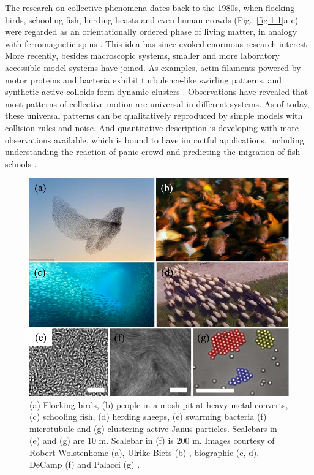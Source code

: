 The research on collective phenomena dates back to the 1980s, when flocking birds, schooling fish, herding beasts and even human crowds (Fig.~\ref{fig:1-1}a-c) were regarded as an orientationally ordered phase of living matter, in analogy with ferromagnetic spins
\cite{Reynolds1987, Vicsek1995, Narayan2007, Ward2008, Ballerini2008, Silverberg2013}. This idea has since evoked enormous research interest. More recently, besides macroscopic systems, smaller and more laboratory accessible model systems have joined. As examples, actin filaments powered by motor proteins and bacteria exhibit turbulence-like swirling patterns, and synthetic active colloids form dynamic clusters
\cite{Dunkel2013, Wensink2012, Buttinoni2013, Palacci2013, Sanchez2012, Schaller2010, Sokolov2007}. Observations have revealed that most patterns of collective motion are universal in different systems. As of today, these universal patterns can be qualitatively reproduced by simple models with collision rules and noise. And quantitative description is developing with more observations available, which is bound to have impactful applications, including understanding the reaction of panic crowd and predicting the migration of fish schools
\cite{Vicsek2012}.

\begin{figure}[!htbp]
	\begin{center}
	\includegraphics[width=5.5 in]{Figs/1-Intro/1.pdf}
	\end{center}
	\caption[Figure 1.1: Examples of living matters and active fluids.]
	{
  (a) Flocking birds, (b) people in a mosh pit at heavy metal converts, (c) schooling fish, (d) herding sheeps, (e) swarming bacteria (f) microtubule and (g) clustering active Janus particles.
  Scalebars in (e) and (g) are 10 \textmu m. Scalebar in (f) is 200 \textmu m. Images courtesy of Robert Wolstenhome (a), Ulrike Biets (b) \cite{Silverberg2013}, biographic (c, d), DeCamp (f) \cite{DeCamp2015} and Palacci (g) \cite{Palacci2013}.
	}
	\label{}
\end{figure}






